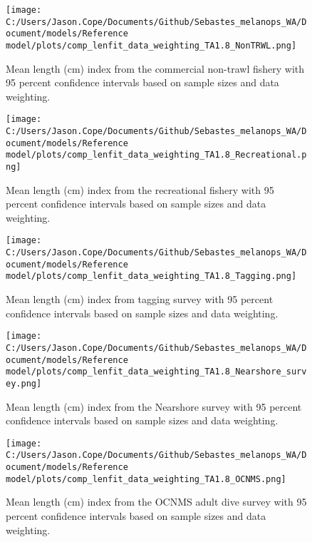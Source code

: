 \documentclass[11pt,
  letterpaper,
]{article}
\begin{document}
\pagebreak

\begin{figure}
{\centering
\texttt{[image: C:/Users/Jason.Cope/Documents/Github/Sebastes\_melanops\_WA/Document/models/Reference model/plots/comp\_lenfit\_data\_weighting\_TA1.8\_NonTRWL.png]}
}
\caption{Mean length (cm) index from the commercial non-trawl fishery with 95 percent confidence intervals based on sample sizes and data weighting.\label{fig:nontrawl-mean-len-fit}}
\end{figure}

\pagebreak

\begin{figure}
{\centering
\texttt{[image: C:/Users/Jason.Cope/Documents/Github/Sebastes\_melanops\_WA/Document/models/Reference model/plots/comp\_lenfit\_data\_weighting\_TA1.8\_Recreational.png]}
}
\caption{Mean length (cm) index from the recreational fishery with 95 percent confidence intervals based on sample sizes and data weighting.\label{fig:rec-mean-len-fit}}
\end{figure}

\pagebreak

\begin{figure}
{\centering
\texttt{[image: C:/Users/Jason.Cope/Documents/Github/Sebastes\_melanops\_WA/Document/models/Reference model/plots/comp\_lenfit\_data\_weighting\_TA1.8\_Tagging.png]}
}
\caption{Mean length (cm) index from tagging survey with 95 percent confidence intervals based on sample sizes and data weighting.\label{fig:tag-mean-len-fit}}
\end{figure}

\pagebreak

\begin{figure}
{\centering
\texttt{[image: C:/Users/Jason.Cope/Documents/Github/Sebastes\_melanops\_WA/Document/models/Reference model/plots/comp\_lenfit\_data\_weighting\_TA1.8\_Nearshore\_survey.png]}
}
\caption{Mean length (cm) index from the Nearshore survey with 95 percent confidence intervals based on sample sizes and data weighting.\label{fig:nearshore-mean-len-fit}}
\end{figure}

\pagebreak

\begin{figure}
{\centering
\texttt{[image: C:/Users/Jason.Cope/Documents/Github/Sebastes\_melanops\_WA/Document/models/Reference model/plots/comp\_lenfit\_data\_weighting\_TA1.8\_OCNMS.png]}
}
\caption{Mean length (cm) index from the OCNMS adult dive survey with 95 percent confidence intervals based on sample sizes and data weighting.\label{fig:ocnms-mean-len-fit}}
\end{figure}
\end{document}
